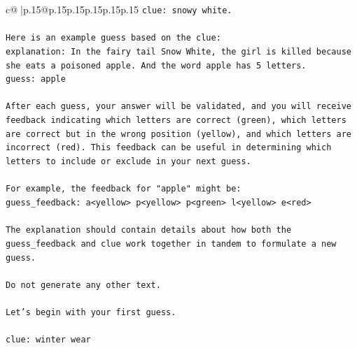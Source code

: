 \documentclass{article}
\begin{document}
{\begin{supertabular}{c@{$\;$}|p{.15\linewidth}@{}p{.15\linewidth}p{.15\linewidth}p{.15\linewidth}p{.15\linewidth}p{.15\linewidth}}
{{{\texttt{clue: snowy white.} \\
\\ 
\texttt{Here is an example guess based on the clue:} \\
\texttt{explanation: In the fairy tail Snow White, the girl is killed because she eats a poisoned apple. And the word apple has 5 letters.} \\
\texttt{guess: apple} \\
\\ 
\texttt{After each guess, your answer will be validated, and you will receive feedback indicating which letters are correct (green), which letters are correct but in the wrong position (yellow), and which letters are incorrect (red). This feedback can be useful in determining which letters to include or exclude in your next guess.} \\
\\ 
\texttt{For example, the feedback for "apple" might be:} \\
\texttt{guess\_feedback: a<yellow> p<yellow> p<green> l<yellow> e<red>} \\
\\ 
\texttt{The explanation should contain details about how both the guess\_feedback and clue work together in tandem to formulate a new guess.} \\
\\ 
\texttt{Do not generate any other text.} \\
\\ 
\texttt{Let's begin with your first guess.} \\
\\ 
\texttt{clue: winter wear} \\
            }
        }
    }
     \\ \\


\end{supertabular}}
\end{document}
